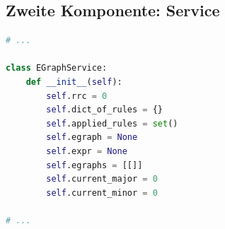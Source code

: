 








\subsection{Zweite Komponente: Service}



\begin{lstlisting}[language=Python, caption=Auszug aus der Datei \textit{EGraphService.py}]
# ... 

class EGraphService:
    def __init__(self):
        self.rrc = 0
        self.dict_of_rules = {}
        self.applied_rules = set()
        self.egraph = None
        self.expr = None
        self.egraphs = [[]]
        self.current_major = 0
        self.current_minor = 0

# ... 
\end{lstlisting} 






